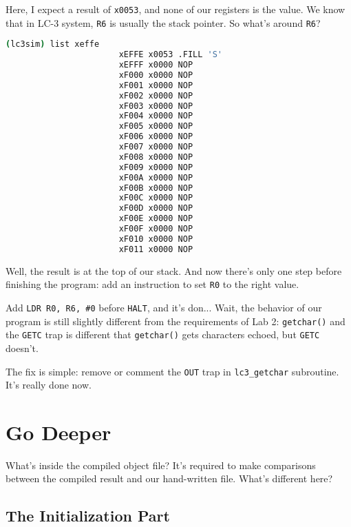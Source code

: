 \documentclass{article}
\begin{document}
	Here, I expect a result of \texttt{x0053}, and none of our registers is the value. We know that in LC-3 system, \texttt{R6} is usually the stack pointer. So what's around \texttt{R6}?
	
	\begin{lstlisting}[language=sh, caption={Contents around \texttt{R6}}]
	(lc3sim) list xeffe
	                   xEFFE x0053 .FILL 'S'
	                   xEFFF x0000 NOP   
	                   xF000 x0000 NOP   
	                   xF001 x0000 NOP   
	                   xF002 x0000 NOP   
	                   xF003 x0000 NOP   
	                   xF004 x0000 NOP   
	                   xF005 x0000 NOP   
	                   xF006 x0000 NOP   
	                   xF007 x0000 NOP   
	                   xF008 x0000 NOP   
	                   xF009 x0000 NOP   
	                   xF00A x0000 NOP   
	                   xF00B x0000 NOP   
	                   xF00C x0000 NOP   
	                   xF00D x0000 NOP   
	                   xF00E x0000 NOP   
	                   xF00F x0000 NOP   
	                   xF010 x0000 NOP   
	                   xF011 x0000 NOP
	\end{lstlisting}
	
	Well, the result is at the top of our stack. And now there's only one step before finishing the program: add an instruction to set \texttt{R0} to the right value.
	
	Add \texttt{LDR R0, R6, \#0} before \texttt{HALT}, and it's don... Wait, the behavior of our program is still slightly different from the requirements of Lab 2: \texttt{getchar()} and the \texttt{GETC} trap is different that \texttt{getchar()} gets characters echoed, but \texttt{GETC} doesn't.
	
	The fix is simple: remove or comment the \texttt{OUT} trap in \texttt{lc3\_getchar} subroutine. It's really done now.
	
	\section{Go Deeper}
	
	What's inside the compiled object file? It's required to make comparisons between the compiled result and our hand-written file. What's different here?
	
	\subsection{The Initialization Part}
	
\end{document}
